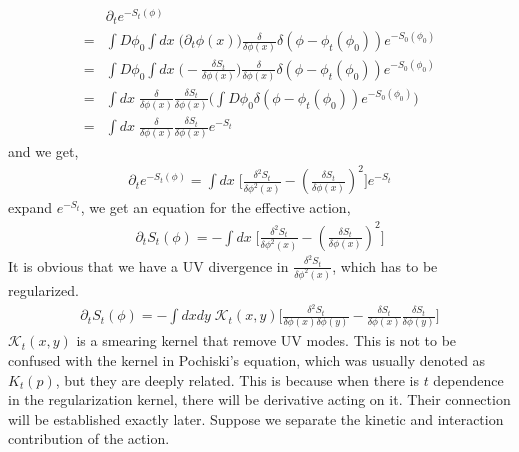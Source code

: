 \documentclass[a4paper,11pt]{article}
\begin{document}
\begin{equation}
\begin{split}
&\partial_t e^{-S_t(\phi)}\\
=&\int D\phi_0  \int dx \;\Big(\partial_t \phi(x) \Big)\frac{\delta}{\delta \phi(x)} \delta(\phi-\phi_t(\phi_0)) e^{-S_0(\phi_0)} \\
=&\int D\phi_0  \int dx \;\Big( -\frac{\delta S_t}{\delta \phi(x)} \Big)\frac{\delta}{\delta \phi(x)} \delta(\phi-\phi_t(\phi_0)) e^{-S_0(\phi_0)}  \\
=&   \int dx \;\frac{\delta}{\delta \phi(x)}  \frac{\delta S_t}{\delta \phi(x)}\Big( \int D\phi_0   \delta(\phi-\phi_t(\phi_0)) e^{-S_0(\phi_0)} \Big) \\
=&  \int dx \;\frac{\delta}{\delta \phi(x)}  \frac{\delta S_t}{\delta \phi(x)} e^{-S_t} \label{Eq:consistency1}
\end{split}
\end{equation}
and we get,
\begin{equation}
\begin{split}
\partial_t e^{-S_t(\phi)}=\int dx \; \Big[\frac{\delta^2 S_t}{\delta \phi^2(x)}-  (\frac{\delta S_t}{\delta \phi(x)} )^2 \Big]e^{-S_t}
\end{split}
\end{equation}
expand $e^{-S_t}$, we get an equation for the effective action,
\begin{equation}
\begin{split}
\partial_t S_t(\phi)=-\int dx \; \Big[\frac{\delta^2 S_t}{\delta \phi^2(x)}-  (\frac{\delta S_t}{\delta \phi(x)} )^2 \Big]
\end{split}
\end{equation}
It is obvious that we have a UV divergence in $\frac{\delta^2 S_t}{\delta \phi^2(x)}$, which has to be regularized. 
\begin{equation}
\begin{split}
\partial_t S_t(\phi)=-\int dxdy \; \mathcal{K}_t(x,y)\Big[\frac{\delta^2 S_t}{\delta \phi(x)\delta \phi(y)}-  \frac{\delta S_t}{\delta \phi(x)} \frac{\delta S_t}{\delta \phi(y)} \Big]
\end{split}
\end{equation}
$\mathcal{K}_t(x,y)$ is a smearing kernel that remove UV modes. This is not to be confused with the kernel in Pochiski's equation, which was usually denoted as $K_t(p)$, but they are deeply related. This is because when there is $t$ dependence in the regularization kernel, there will be derivative acting on it. Their connection will be established exactly later. Suppose we separate the kinetic and interaction contribution of the action.
\end{document}
